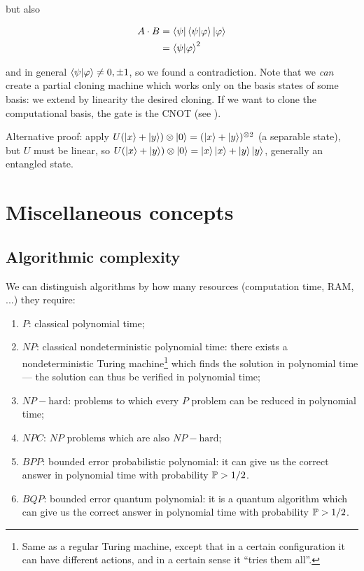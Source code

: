 \documentclass[main.tex]{subfiles}
\begin{document}
but also

\begin{subequations}
\begin{align}
  A \cdot B &= \bra{\psi} \bra{\psi}  \ket{\varphi} \ket{\varphi}   \\
  &= \braket{\psi}{\varphi}^2
\end{align}
\end{subequations}

and in general \(\braket{\psi}{\varphi} \neq 0,\pm 1\), so we found a contradiction. Note that we \emph{can} create a partial cloning machine which works only on the basis states of some basis: we extend by linearity the desired cloning. If we want to clone the computational basis, the gate is the CNOT (see ).

\begin{bluebox}
  Alternative proof: apply \(U (\ket{x} + \ket{y}) \otimes \ket{0} = (\ket{x} + \ket{y}) ^{\otimes 2} \) (a separable state), but \(U\) must be linear, so \(U (\ket{x} + \ket{y}) \otimes \ket{0} = \ket{x} \ket{x} + \ket{y} \ket{y} \), generally an entangled state.
\end{bluebox}

\section{Miscellaneous concepts}

\subsection{Algorithmic complexity}

We can distinguish algorithms by how many resources (computation time, RAM, ...) they require:

\begin{enumerate}
    \item \(P\): classical polynomial time;
    \item \(NP\): classical nondeterministic polynomial time: there exists a nondeterministic Turing machine\footnote{Same as a regular Turing machine, except that in a certain configuration it can have different actions, and in a certain sense it ``tries them all''.} which finds the solution in polynomial time --- the solution can thus be verified in polynomial time;
    \item \(NP-\text{hard}\): problems to which every \(P\) problem can be reduced in polynomial time;
    \item \(NPC\): \(NP\) problems which are also \(NP-\text{hard}\);
    \item \(BPP\): bounded error probabilistic polynomial: it can give us the correct answer in polynomial time with probability \(\P>1/2\).
    \item \(BQP\): bounded error quantum polynomial: it is a quantum algorithm which can give us the correct answer in polynomial time with probability \(\P>1/2\).
\end{enumerate}
\end{document}
